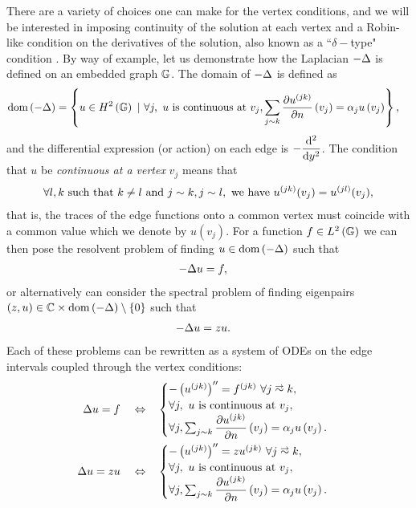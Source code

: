 There are a variety of choices one can make for the vertex conditions, and we will be interested in imposing continuity of the solution at each vertex and a Robin-like condition on the derivatives of the solution, also known as a ``$\delta-$type" condition \cite{berkolaiko2013introduction, albeverio2012solvable}.
By way of example, let us demonstrate how the Laplacian $-\Delta$ is defined on an embedded graph $\mathbb{G}$.
The domain of $-\Delta$ is defined as
\begin{align} \label{eq:GraphLaplacianExample}
	\mathrm{dom}\left( -\Delta \right) &= \left\{  u\in H^2\left( \mathbb{G} \right) \ \vert \ \forall j, \ u \text{ is continuous at } v_j, \sum_{j\sim k}\dfrac{\partial u^{(jk)}}{\partial n}\left( v_j \right) = \alpha_j u\left( v_j \right)  \right\},
\end{align}
and the differential expression (or action) on each edge is $-\dfrac{\mathrm{d}^2 }{\mathrm{d} {y}^2}$.
The condition that $u$ be \emph{continuous at a vertex} $v_j$ means that
\begin{align*}
	\forall l,k \text{ such that } k\neq l \text{ and } j\sim k, j\sim l, \text{ we have } u^{(jk)}(v_j) = u^{(jl)}(v_j),
\end{align*}
that is, the traces of the edge functions onto a common vertex must coincide with a common value which we denote by $u(v_j)$.
For a function $f\in L^2\left( \mathbb{G} \right)$ we can then pose the resolvent problem of finding $u\in\mathrm{dom}\left( -\Delta \right)$ such that
\begin{align*}
	-\Delta u &= f,
\end{align*}
or alternatively can consider the spectral problem of finding eigenpairs $\left( z,u \right)\in\mathbb{C}\times\mathrm{dom}\left( -\Delta \right)\setminus\left\{ 0 \right\}$ such that
\begin{align*}
	-\Delta u &= z u.
\end{align*}
Each of these problems can be rewritten as a system of ODEs on the edge intervals coupled through the vertex conditions:
\begin{align*}
	\laplacian u = f \quad\Leftrightarrow\quad &
	\begin{cases}
		-\bracs{u^{(jk)}}'' = f^{(jk)} \ \forall j\conLeft k, \\
		\forall j, \ u \text{ is continuous at } v_j, \\
		\forall j, \sum_{j\con k}\pdiff{u^{(jk)}}{n}\bracs{v_j} = \alpha_j u\bracs{v_j}.
	\end{cases} \\
	\laplacian u = z u \quad\Leftrightarrow\quad &
	\begin{cases}
		-\bracs{u^{(jk)}}'' = z u^{(jk)} \ \forall j\conLeft k, \\
		\forall j, \ u \text{ is continuous at } v_j, \\
		\forall j, \sum_{j\con k}\pdiff{u^{(jk)}}{n}\bracs{v_j} = \alpha_j u\bracs{v_j}.
	\end{cases}
\end{align*}

